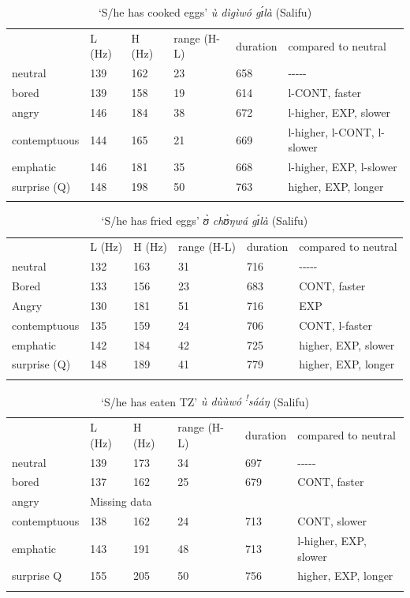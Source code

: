 \documentclass[output=paper]{langsci/langscibook}
\begin{document}
\begin{table}
 \caption{ ‘S/he has cooked eggs'  \emph{ù dìgìwó gɪ́là}  (Salifu)}

\begin{tabular}{llllll} & L (Hz) & H (Hz) & range (H-L) & duration & compared to neutral\\
\lsptoprule
neutral & 139 & 162 & 23 & 658 & {}-{}-{}-{}-{}-\\
bored & 139 & 158 & 19 & 614 & l-CONT, faster\\
angry & 146 & 184 & 38 & 672 & l-higher, EXP, slower\\
contemptuous & 144 & 165 & 21 & 669 & l-higher, l-CONT, l-slower\\
emphatic & 146 & 181 & 35 & 668 & l-higher, EXP, l-slower\\
surprise (Q) & 148 & 198 & 50 & 763 & higher, EXP, longer\\
\lspbottomrule
\end{tabular}
\end{table}

\begin{table}
\caption{‘S/he has fried eggs'   \emph{ʊ̀ chʊ̀ŋwá gɪ́là}  (Salifu)}

\begin{tabular}{llllll} & L (Hz) & H (Hz) & range (H-L) & duration & compared to neutral\\
\lsptoprule
neutral & 132 & 163 & 31 & 716 & {}-{}-{}-{}-{}-\\
Bored & 133 & 156 & 23 & 683 & CONT, faster\\
Angry & 130 & 181 & 51 & 716 & EXP\\
contemptuous & 135 & 159 & 24 & 706 & CONT, l-faster\\
emphatic & 142 & 184 & 42 & 725 & higher, EXP, slower\\
surprise (Q) & 148 & 189 & 41 & 779 & higher, EXP, longer\\
\lspbottomrule
\end{tabular}
\end{table}

\begin{table}
\caption{‘S/he has eaten TZ'  \emph{ù dùùwó \textsuperscript{!}sááŋ}  (Salifu)}

\begin{tabular}{llllll} & L (Hz) & H (Hz) & range (H-L) & duration & compared to neutral\\
\lsptoprule
neutral & 139 & 173 & 34 & 697 & {}-{}-{}-{}-{}-\\
bored & 137 & 162 & 25 & 679 & CONT, faster\\
angry & \multicolumn{5}{l}{ Missing data}\\
contemptuous & 138 & 162 & 24 & 713 & CONT, slower\\
emphatic & 143 & 191 & 48 & 713 & l-higher, EXP, slower\\
surprise Q & 155 & 205 & 50 & 756 & higher, EXP, longer\\
\lspbottomrule
\end{tabular}
\end{table}
\end{document}
